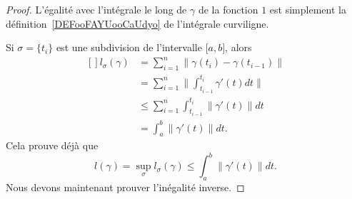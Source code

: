\begin{proof}
	L'égalité avec l'intégrale le long de \( \gamma\) de la fonction \( 1\) est simplement la définition~\ref{DEFooFAYUooCaUdyo} de l'intégrale curviligne.

	Si \( \sigma=\{ t_i \}\) est une subdivision de l'intervalle \( \mathopen[ a , b \mathclose]\), alors
	\begin{equation}
		\begin{aligned}[]
			l_{\sigma}(\gamma) & =\sum_{i=1}^n\| \gamma(t_i)-\gamma(t_{i-1}) \|         \\
			                   & =\sum_{i=1}^n\| \int_{t_{i-1}}^{t_i}\gamma'(t)dt \|    \\
			                   & \leq\sum_{i=1}^n\int_{t_{i-1}}^{t_i}\| \gamma'(t) \|dt \\
			                   & =\int_a^b\| \gamma'(t) \|dt.
		\end{aligned}
	\end{equation}
	Cela prouve déjà que
	\begin{equation}        \label{Eq_0208lsigsigmmintifp}
		l(\gamma)=\sup_{\sigma}l_{\sigma}(\gamma)\leq\int_a^b\| \gamma'(t) \|dt.
	\end{equation}
	Nous devons maintenant prouver l'inégalité inverse.


\end{proof}
